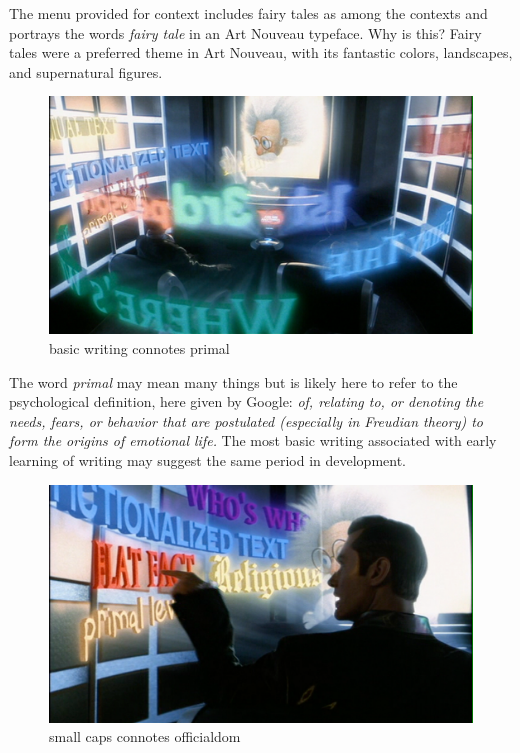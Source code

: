 The menu provided for context includes fairy tales as among the contexts
and portrays the words \emph{fairy tale} in an Art Nouveau typeface. Why
is this? Fairy tales were a preferred theme in Art Nouveau, with its
fantastic colors, landscapes, and supernatural figures.

\begin{figure}
\centering
\includegraphics{./fiDrKnowMenu2.pdf}
\caption{basic writing connotes primal}
\end{figure}

The word \emph{primal} may mean many things but is likely here to refer
to the psychological definition, here given by Google: \emph{of,
relating to, or denoting the needs, fears, or behavior that are
postulated (especially in Freudian theory) to form the origins of
emotional life.} The most basic writing associated with early learning
of writing may suggest the same period in development.

\begin{figure}
\centering
\includegraphics{./fiDrKnowMenu3.pdf}
\caption{small caps connotes officialdom}
\end{figure}

